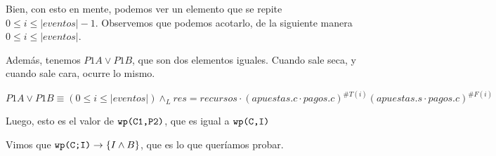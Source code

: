 \documentclass[../document.tex]{subfiles}
\begin{document}
Bien, con esto en mente, podemos ver un elemento que se repite \\$0\leq i \leq |eventos|-1$. Observemos que podemos acotarlo, de la siguiente manera $0\leq i \leq |eventos|$. 

Además, tenemos $P1A \lor P1B$, que son dos elementos iguales. Cuando sale seca, y cuando sale cara, ocurre lo mismo. 

\begin{equation}
    P1A \lor P1B \equiv
    (0\leq i \leq |eventos|)\land_{L}
    res = recursos \cdot (apuestas.c\cdot pagos.c)^{\#T(i)}(apuestas.s\cdot pagos.c)^{\#F(i)}
\end{equation}

Luego, esto es el valor de $\verb+wp(C1,P2)+$, que es igual a $\verb+wp(C,I)+$

Vimos que $\verb+wp(C;I)+ \to \{I \land B\}$, que es lo que queríamos probar.
\end{document}
